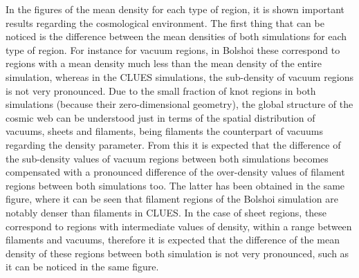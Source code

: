 In the figures of the mean density for each type of region, it is shown 
important results regarding the cosmological environment. The first thing
that can be noticed is the difference between the mean densities of both 
simulations for each type of region. For instance for vacuum regions, in
Bolshoi these correspond to regions with a mean density much less than 
the mean density of the entire simulation, whereas in the CLUES 
simulations, the sub-density of vacuum regions is not very pronounced.
Due to the small fraction of knot regions in both simulations (because 
their zero-dimensional geometry), the global structure of the cosmic web
can be understood just in terms of the spatial distribution of vacuums,
sheets and filaments, being filaments the counterpart of vacuums regarding
the density parameter. From this it is expected that the difference 
of the sub-density values of vacuum regions between both simulations 
becomes compensated with a pronounced difference of the over-density 
values of filament regions between both simulations too. The latter has been 
obtained in the same figure, where it can be seen that filament regions of
the Bolshoi simulation are notably denser than filaments in CLUES. In the
case of sheet regions, these correspond to regions with intermediate 
values of density, within a range between filaments and vacuums, therefore
it is expected that the difference of the mean density of these 
regions between both simulation is not very pronounced, such as it can be 
noticed in the same figure.


